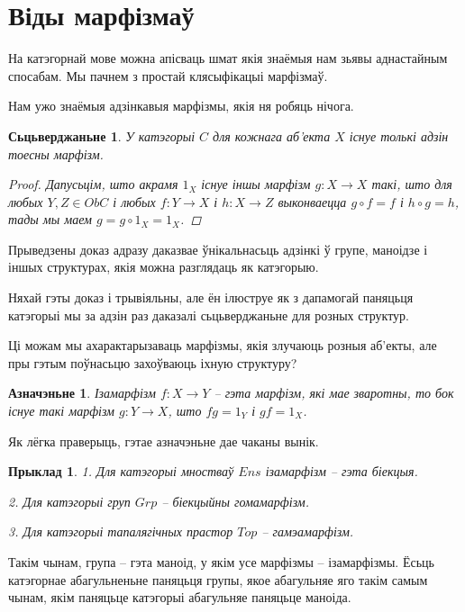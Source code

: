 \documentclass[a4paper,12pt]{book}
\newtheorem{claim}{Сьцьверджаньне}[section]
\newtheorem{example}{Прыклад}[section]
\newtheorem{definition}{Азначэньне}[section]
\begin{document}
\section{Віды марфізмаў}

На катэгорнай мове можна апісваць шмат якія знаёмыя нам зьявы
аднастайным спосабам. Мы пачнем з простай клясыфікацыі марфізмаў.

Нам ужо знаёмыя адзінкавыя марфізмы, якія ня робяць нічога.

\begin{claim}
  У катэгорыі $C$ для кожнага аб'екта $X$ існуе толькі адзін тоесны
  марфізм.
  \begin{proof}
    Дапусьцім, што акрамя $1_X$ існуе іншы марфізм $g: X \rightarrow X$
    такі, што для любых $Y, Z \in ObC$ і любых $f:Y \rightarrow X$ і
    $h:X \rightarrow Z$ выконваецца $g \circ f = f$ і $h \circ g = h$,
    тады мы маем $g = g \circ 1_X = 1_X$.
  \end{proof}
\end{claim}

Прыведзены доказ адразу даказвае ўнікальнасьць адзінкі ў групе,
маноідзе і іншых структурах, якія можна разглядаць як катэгорыю.

Няхай гэты доказ і трывіяльны, але ён ілюструе як з дапамогай паняцьця
катэгорыі мы за адзін раз даказалі сьцьверджаньне для розных
структур.

Ці можам мы ахарактарызаваць марфізмы, якія злучаюць розныя аб'екты,
але пры гэтым поўнасьцю захоўваюць іхную структуру?

\begin{definition}
  Ізамарфізм $f: X \rightarrow Y$ -- гэта марфізм, які мае зваротны,
  то бок існуе такі марфізм $g: Y \rightarrow X$, што $fg = 1_Y$ і $gf
  = 1_X$.
\end{definition}

Як лёгка праверыць, гэтае азначэньне дае чаканы вынік.

\begin{example}
  1. Для катэгорыі мностваў $Ens$ ізамарфізм -- гэта біекцыя.

  2. Для катэгорыі груп $Grp$ -- біекцыйны гомамарфізм.

  3. Для катэгорыі тапалягічных прастор $Top$ -- гамэамарфізм.
\end{example}

Такім чынам, група -- гэта маноід, у якім усе марфізмы --
ізамарфізмы. Ёсьць катэгорнае абагульненьне паняцьця групы, якое
абагульняе яго такім самым чынам, якім паняцьце катэгорыі абагульняе
паняцьце маноіда.
\end{document}
